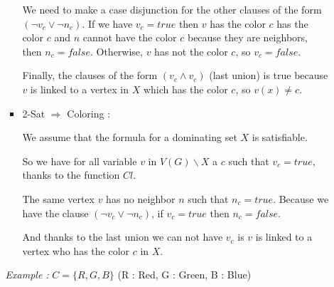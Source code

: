 \documentclass{article}
\theoremstyle{plain}
\begin{document}
\begin{enumerate}
\begin{enumerate}
\begin{itemize}
              We need to make a case disjunction for the other
              clauses of the form $(\neg v_c \vee \neg n_c)$.
              If we have $v_c = true$ then $v$ has the color $c$ has the color
              $c$ and $n$ cannot
              have the color $c$ because they are neighbors, then $n_c = false$.
              Otherwise, $v$ has not the color $c$, so $v_c = false$.

              Finally, the clauses of the form $(v_c \wedge v_c)$ (last union)
              is true because $v$ is linked to a vertex in $X$ which has the
              color $c$, so $v(x) \not = c$.

            \item 2-Sat $\Rightarrow$ Coloring :

              We assume that the formula for a dominating set $X$ is
              satisfiable.

              So we have for all variable $v$ in $V(G)\backslash X$ a $c$ such
              that $v_c = true$, thanks to the function $Cl$.

              The same vertex
              $v$ has no neighbor $n$ such that $n_c = true$. Because we have
              the clause $(\neg v_c \vee \neg n_c)$, if $v_c = true$ then $n_c =
              false$.

              And thanks to the last union we can not have $v_c$ is $v$ is
              linked to a vertex who has the color $c$ in $X$.
          \end{itemize}

          \newpage
          \textit{Example :} $C = \{R, G, B\}$ (R : Red, G : Green, B : Blue)

          \begin{center}
        \end{center}


\end{enumerate}
\end{enumerate}
\end{document}
